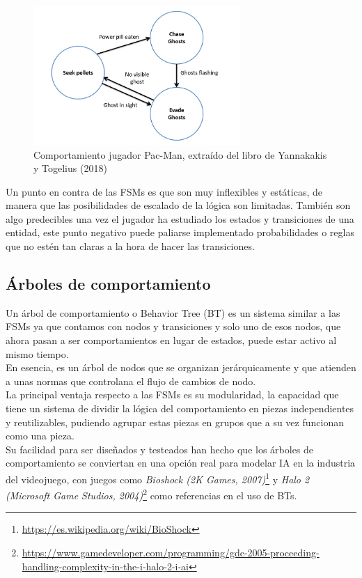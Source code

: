 \begin{figure}[h]
	\centering
	\includegraphics[width = 0.7\textwidth]{Imagenes/FMS_MsPac-man.png}
	\caption{Comportamiento jugador Pac-Man, extraído del libro de Yannakakis y Togelius (2018)}
	\label{fig:Comportamiento jugador Pac-Man}
\end{figure}

Un punto en contra de las FSMs es que son muy inflexibles y estáticas, de manera que las posibilidades de escalado de la lógica son limitadas. También son algo predecibles una vez el jugador ha estudiado los estados y transiciones de una entidad, este punto negativo puede paliarse implementado probabilidades o reglas que no estén tan claras a la hora de hacer las transiciones.

\subsection{Árboles de comportamiento}

Un árbol de comportamiento o Behavior Tree (BT) es un sistema similar a las FSMs ya que contamos con nodos y transiciones y solo uno de esos nodos, que ahora pasan a ser comportamientos en lugar de estados, puede estar activo al mismo tiempo. \\
En esencia, es un árbol de nodos que se organizan jerárquicamente y que atienden a unas normas que controlana el flujo de cambios de nodo. \\

La principal ventaja respecto a las FSMs es su modularidad, la capacidad que tiene un sistema de dividir la lógica del comportamiento en piezas independientes y reutilizables, pudiendo agrupar estas piezas en grupos que a su vez funcionan como una pieza. \\
Su facilidad para ser diseñados y testeados han hecho que los árboles de comportamiento se conviertan en una opción real para modelar IA en la industria del videojuego, con juegos como \textit{Bioshock (2K Games, 2007)}\footnote{\url{https://es.wikipedia.org/wiki/BioShock}} y \textit{Halo 2 (Microsoft Game Studios, 2004)}\footnote{\url{ https://www.gamedeveloper.com/programming/gdc-2005-proceeding-handling-complexity-in-the-i-halo-2-i-ai}} como referencias en el uso de BTs.\\

